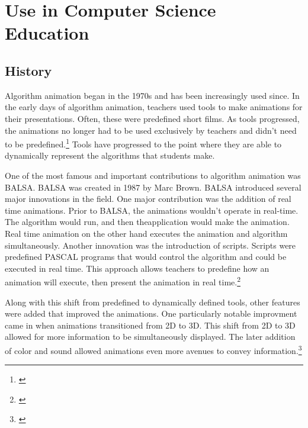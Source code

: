 \documentclass[12pt,twoside]{reedthesis}
\begin{document}
\section{Use in Computer Science Education}

\subsection{History}
Algorithm animation began in the 1970s and has been increasingly used since. In the early days of algorithm animation, teachers used tools to make animations for their presentations. Often, these were predefined short films. As tools progressed, the animations no longer had to be used exclusively by teachers and didn't need to be predefined.\footnote{\cite{hundhausen_meta-study_2002}} Tools have progressed to the point where they are able to dynamically represent the algorithms that students make. 

One of the most famous and important contributions to algorithm animation was BALSA. BALSA was created in 1987 by Marc Brown. BALSA introduced several major innovations in the field. One major contribution was the addition of real time animations. Prior to BALSA, the animations wouldn't operate in real-time. The algorithm would run, and then theapplication would make the animation. Real time animation on the other hand executes the animation and algorithm simultaneously. Another innovation was the introduction of scripts. Scripts were predefined PASCAL programs that would control the algorithm and could be executed in real time. This approach allows teachers to predefine how an animation will execute, then present the animation in real time.\footnote{\cite{brown_algorithm_1987}}

Along with this shift from predefined to dynamically defined tools, other features were added that improved the animations. One particularly notable improvment came in when animations transitioned from 2D to 3D. This shift from 2D to 3D allowed for more information to be simultaneously displayed. The later addition of color and sound allowed animations even more avenues to convey information.\footnote{\cite{najork_library_1994}}
\end{document}
